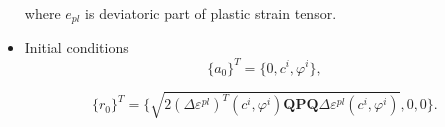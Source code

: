 \begin{itemize}
	where $e_{pl}$ is deviatoric part of plastic strain tensor. 
		
	\item Initial conditions
	\begin{equation}
		\lbrace a_0 \rbrace^T = \lbrace 0, c^i, \varphi^i\rbrace,
	\end{equation}
	
	\begin{equation}
		\lbrace r_0 \rbrace^T = \lbrace \sqrt{2(\Delta \varepsilon^{pl})^T(c^i, \varphi^i) \textbf{QPQ}\Delta\varepsilon^{pl}(c^i, \varphi^i)}, 0, 0\rbrace.
	\end{equation}
\end{itemize}
 
